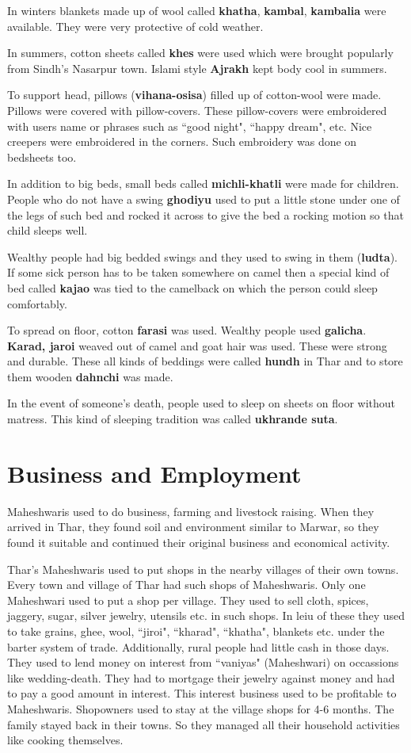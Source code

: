 In winters blankets made up of wool called \textbf{khatha}, \textbf{kambal},
\textbf{kambalia} were available. They were very protective of cold weather.

In summers, cotton sheets called \textbf{khes} were used which were brought
popularly from Sindh's Nasarpur town. Islami style \textbf{Ajrakh} kept body cool in
summers. 

To support head, pillows (\textbf{vihana-osisa}) filled up of cotton-wool were
made. Pillows were covered with pillow-covers. These pillow-covers were
embroidered with users name or phrases such as ``good night", ``happy dream",
etc. Nice creepers were embroidered in the corners. Such embroidery was done
on bedsheets too.

In addition to big beds, small beds called \textbf{michli-khatli} were made for
children. People who do not have a swing \textbf{ghodiyu} used to put a little
stone under one of the legs of such bed and rocked it across to give the bed a
rocking motion so that child sleeps well.

Wealthy people had big bedded swings and they used to swing in them
(\textbf{ludta}). If some sick person has to be taken somewhere on camel then a
special kind of bed called \textbf{kajao} was tied to the camelback on which the
person could sleep comfortably.

To spread on floor, cotton \textbf{farasi} was used. Wealthy people used
\textbf{galicha}. \textbf{Karad, jaroi} weaved out of camel and goat hair was
used. These were strong and durable. These all kinds of beddings were called
\textbf{hundh} in Thar and to store them wooden \textbf{dahnchi} was made.

In the event of someone's death, people used to sleep on sheets on floor without
matress. This kind of sleeping tradition was called \textbf{ukhrande suta}.

\section{Business and Employment}
Maheshwaris used to do business, farming and livestock raising. When they
arrived in Thar, they found soil and environment similar to Marwar, so they
found it suitable and continued their original business and economical activity.

Thar's Maheshwaris used to put shops in the nearby villages of their own towns.
Every town and village of Thar had such shops of Maheshwaris. Only one
Maheshwari used to put a shop per village. They used to sell cloth, spices,
jaggery, sugar, silver jewelry, utensils etc. in such shops. In leiu of these
they used to take grains, ghee, wool, ``jiroi", ``kharad", ``khatha", blankets
etc. under the barter system of trade. Additionally, rural people had little
cash in those days. They used to lend money on interest from ``vaniyas"
(Maheshwari) on occassions like wedding-death. They had to mortgage their
jewelry against money and had to pay a good amount in interest. This interest
business used to be profitable to Maheshwaris. Shopowners used to stay at the
village shops for 4-6 months. The family stayed back in their towns. So they
managed all their household activities like cooking themselves.

